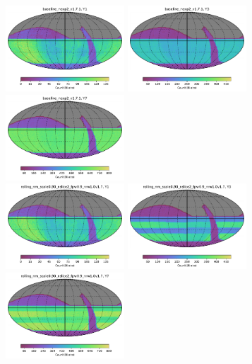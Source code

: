 \documentclass[modern]{aastex62}
\begin{document}
\begin{figure}
\includegraphics[width=1.75in]{plots/yearly_release/baseline_nexp2_v1_7_1_Count_night_lt_365_and_note_not_like_DD_HEAL_SkyMap.pdf}
\includegraphics[width=1.75in]{plots/yearly_release/baseline_nexp2_v1_7_1_Count_nightlt1095_and_note_not_like_DD_HEAL_SkyMap.pdf}
\includegraphics[width=1.75in]{plots/yearly_release/baseline_nexp2_v1_7_1_Count_night_lt_2556_and_note_not_like_DD_HEAL_SkyMap.pdf}\\
\includegraphics[width=1.75in]{plots/yearly_release/rolling_nm_scale0_90_nslice2_fpw0_9_nrw1_0v1_7_Count_night_lt_365_and_note_not_like_DD_HEAL_SkyMap.pdf}
\includegraphics[width=1.75in]{plots/yearly_release/rolling_nm_scale0_90_nslice2_fpw0_9_nrw1_0v1_7_Count_nightlt1095_and_note_not_like_DD_HEAL_SkyMap.pdf}
\includegraphics[width=1.75in]{plots/yearly_release/rolling_nm_scale0_90_nslice2_fpw0_9_nrw1_0v1_7_Count_night_lt_2556_and_note_not_like_DD_HEAL_SkyMap.pdf}\\

\end{figure}
\end{document}

